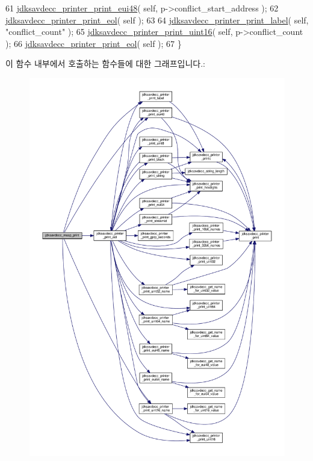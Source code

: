 \begin{DoxyCode}
61     \hyperlink{group__util_gacb8108c4a12e752331804ec34d89f9ab}{jdksavdecc\_printer\_print\_eui48}( \textcolor{keyword}{self}, p->conflict\_start\_address );
62     \hyperlink{group__util_gacda56c9d3d24593a52c999682fa6e6e3}{jdksavdecc\_printer\_print\_eol}( \textcolor{keyword}{self} );
63 
64     \hyperlink{group__util_gaf7818b24143b3c7502926a425a242ff5}{jdksavdecc\_printer\_print\_label}( \textcolor{keyword}{self}, \textcolor{stringliteral}{"conflict\_count"} );
65     \hyperlink{group__util_ga9793e0ff8e7ed25d957282ee6b257ce2}{jdksavdecc\_printer\_print\_uint16}( \textcolor{keyword}{self}, p->conflict\_count );
66     \hyperlink{group__util_gacda56c9d3d24593a52c999682fa6e6e3}{jdksavdecc\_printer\_print\_eol}( \textcolor{keyword}{self} );
67 \}
\end{DoxyCode}


이 함수 내부에서 호출하는 함수들에 대한 그래프입니다.\+:
\nopagebreak
\begin{figure}[H]
\begin{center}
\leavevmode
\includegraphics[width=350pt]{group__maap__print_ga899740505230fe4b1d956de028abad49_cgraph}
\end{center}
\end{figure}




